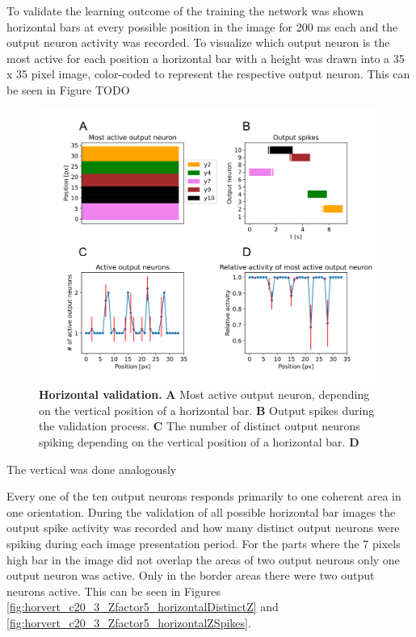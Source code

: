 
To validate the learning outcome of the training the network was shown horizontal bars at every possible position in the image for 200 ms each and the output neuron activity was recorded. To visualize which output neuron is the most active for each position a horizontal bar with a height was drawn into a 35 x 35 pixel image, color-coded to represent the respective output neuron. This can be seen in Figure  TODO


\begin{figure}
  \includegraphics[width=\linewidth]{figures/horvertAdaptiveInh/horizontal_validation.png}
  \caption{\textbf{Horizontal validation.} \textbf{A} Most active output neuron, depending on the vertical position of a horizontal bar.  \textbf{B} Output spikes during the validation process. \textbf{C} The number of distinct output neurons spiking depending on the vertical position of a horizontal bar.  \textbf{D}  }
  \label{fig:horvertAdaptiveInhibitionPriorValResults}
\end{figure}

 The vertical was done analogously
 
Every one of the ten output neurons responds primarily to one coherent area in one orientation.
During the validation of all possible horizontal bar images the output spike activity was recorded and how many distinct output neurons were spiking during each image presentation period. For the parts where the 7 pixels high bar in the image did not overlap the areas of two output neurons only one output neuron was active. Only in the border areas there were two output neurons active. This can be seen in Figures \ref{fig:horvert_c20_3_Zfactor5_horizontalDistinctZ} and \ref{fig:horvert_c20_3_Zfactor5_horizontalZSpikes}.





